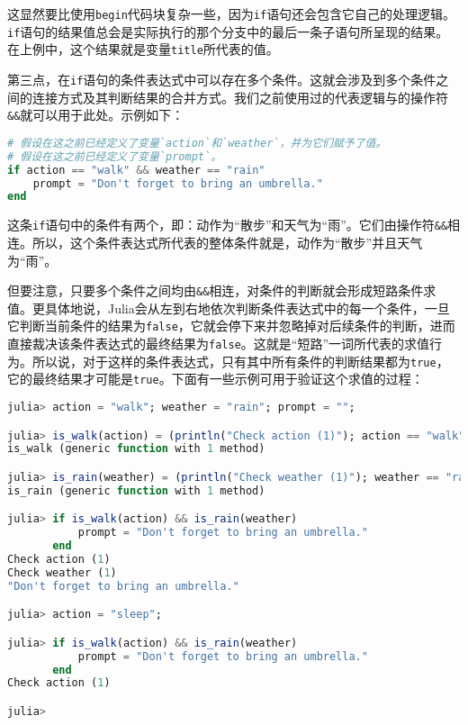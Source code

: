 这显然要比使用\verb|begin|代码块复杂一些，因为\verb|if|语句还会包含它自己的处理逻辑。\verb|if|语句的结果值总会是实际执行的那个分支中的最后一条子语句所呈现的结果。在上例中，这个结果就是变量\verb|title|所代表的值。

第三点，在\verb|if|语句的条件表达式中可以存在多个条件。这就会涉及到多个条件之间的连接方式及其判断结果的合并方式。我们之前使用过的代表逻辑与的操作符\verb|&&|就可以用于此处。示例如下：

\begin{lstlisting}[language=julia]
# 假设在这之前已经定义了变量`action`和`weather`，并为它们赋予了值。
# 假设在这之前已经定义了变量`prompt`。
if action == "walk" && weather == "rain"
    prompt = "Don't forget to bring an umbrella."
end
\end{lstlisting}

这条\verb|if|语句中的条件有两个，即：动作为“散步”和天气为“雨”。它们由操作符\verb|&&|相连。所以，这个条件表达式所代表的整体条件就是，动作为“散步”并且天气为“雨”。

但要注意，只要多个条件之间均由\verb|&&|相连，对条件的判断就会形成短路条件求值。更具体地说，Julia会从左到右地依次判断条件表达式中的每一个条件，一旦它判断当前条件的结果为\verb|false|，它就会停下来并忽略掉对后续条件的判断，进而直接裁决该条件表达式的最终结果为\verb|false|。这就是“短路”一词所代表的求值行为。所以说，对于这样的条件表达式，只有其中所有条件的判断结果都为\verb|true|，它的最终结果才可能是\verb|true|。下面有一些示例可用于验证这个求值的过程：

\begin{lstlisting}[language=julia]
julia> action = "walk"; weather = "rain"; prompt = "";

julia> is_walk(action) = (println("Check action (1)"); action == "walk")
is_walk (generic function with 1 method)

julia> is_rain(weather) = (println("Check weather (1)"); weather == "rain")
is_rain (generic function with 1 method)

julia> if is_walk(action) && is_rain(weather)
           prompt = "Don't forget to bring an umbrella."
       end
Check action (1)
Check weather (1)
"Don't forget to bring an umbrella."

julia> action = "sleep";

julia> if is_walk(action) && is_rain(weather)
           prompt = "Don't forget to bring an umbrella."
       end
Check action (1)

julia> 
\end{lstlisting}

